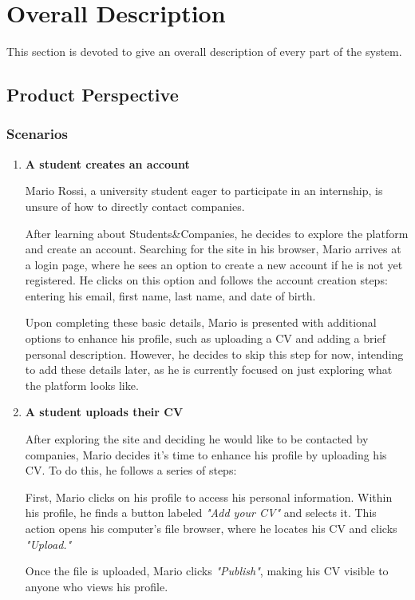 \chapter{Overall Description}
This section is devoted to give an overall description of every part of the system.

\section{Product Perspective}
\subsection{Scenarios}
\begin{enumerate} 
    \item \textbf{A student creates an account}

    Mario Rossi, a university student eager to participate in an internship, is unsure of how to directly contact companies. 
    
    After learning about Students\&Companies, he decides to explore the platform and create an account. Searching for the site in his browser, Mario arrives at a login page, where he sees an option to create a new account if he is not yet registered. He clicks on this option and follows the account creation steps: entering his email, first name, last name, and date of birth.
    
    Upon completing these basic details, Mario is presented with additional options to enhance his profile, such as uploading a CV and adding a brief personal description. However, he decides to skip this step for now, intending to add these details later, as he is currently focused on just exploring what the platform looks like.
    \item \textbf{A student uploads their CV}

    After exploring the site and deciding he would like to be contacted by companies, Mario decides it’s time to enhance his profile by uploading his CV. To do this, he follows a series of steps:

    First, Mario clicks on his profile to access his personal information. Within his profile, he finds a button labeled \textit{"Add your CV"} and selects it. This action opens his computer's file browser, where he locates his CV and clicks \textit{"Upload."} 
    
    Once the file is uploaded, Mario clicks \textit{"Publish"}, making his CV visible to anyone who views his profile.


\end{enumerate}
